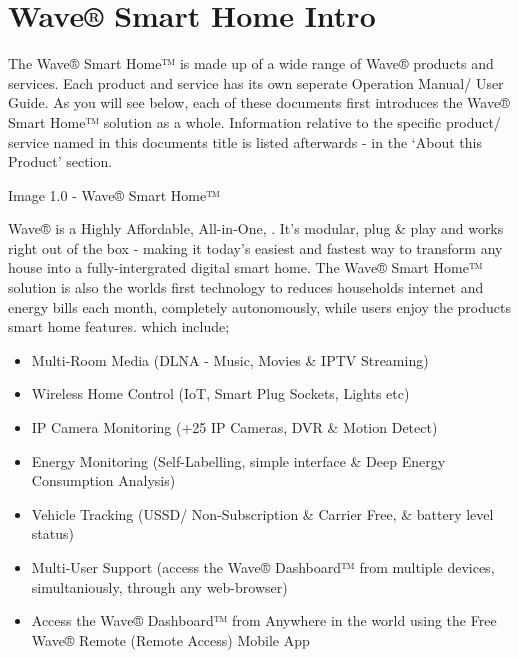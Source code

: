 \documentclass[letterpaper,10pt,english]{sphinxmanual}
\begin{document}
\chapter{Wave® Smart Home Intro}
\label{\detokenize{introduction:wave-smart-home-intro}}\label{\detokenize{introduction::doc}}
The Wave® Smart Home™ is made up of a wide range of Wave® products and services. Each product and service has its own seperate Operation Manual/ User Guide.
As you will see below, each of these documents first introduces the Wave® Smart Home™ solution as a whole.
Information relative to the specific product/ service named in this documents title is listed afterwards - in the ‘About this Product’ section.

Image 1.0 - Wave® Smart Home™

\noindent{}

Wave® is a Highly Affordable, All-in-One, . It’s modular, plug \& play and works right out of the box - making it today’s easiest and fastest way to transform any house into a fully-intergrated digital smart home. The Wave® Smart Home™ solution is also the worlds first technology to reduces households internet and energy bills each month, completely autonomously, while users enjoy the products  smart home features. which include;
\begin{itemize}
\item {} 
Multi-Room Media (DLNA - Music, Movies \& IPTV Streaming)

\item {} 
Wireless Home Control (IoT, Smart Plug Sockets, Lights etc)

\item {} 
IP Camera Monitoring (+25 IP Cameras, DVR \& Motion Detect)

\item {} 
Energy Monitoring (Self-Labelling, simple interface \& Deep Energy Consumption Analysis)

\item {} 
Vehicle Tracking (USSD/ Non-Subscription \& Carrier Free, \& battery level status)

\item {} 
Multi-User Support (access the Wave® Dashboard™ from multiple devices, simultaniously, through any web-browser)

\item {} 
Access the Wave® Dashboard™ from Anywhere in the world using the Free Wave® Remote (Remote Access) Mobile App

\end{itemize}
\end{document}
